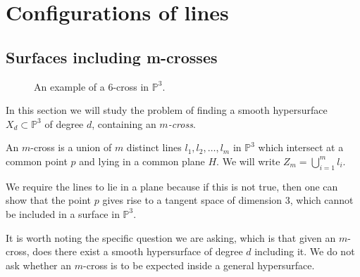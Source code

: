 \chapter{Configurations of lines}\label{configs}
\section{Surfaces including m-crosses}

\begin{figure}
    \centering
    
  \caption{An example of a 6-cross in $\mathbb{P}^3$.}
  \label{fig:Z_6}
\end{figure}

In this section we will study the problem of finding a smooth hypersurface $X_d \subset \mathbb{P}^3$ of degree $d$, containing an \emph{$m$-cross}. 

\begin{definition}
    An $m$-cross is a union of $m$ distinct lines $l_1, l_2, \dots, l_m$ in $\mathbb{P}^3$ which intersect at a common point $p$ and lying in a common plane $H$. We will write $Z_m = \bigcup_{i=1}^m l_i$.
\end{definition}

We require the lines to lie in a plane because if this is not true, then one can show that the point $p$ gives rise to a tangent space of dimension 3, which cannot be included in a surface in $\mathbb{P}^3$. 


It is worth noting the specific question we are asking, which is that given an $m$-cross, does there exist a smooth hypersurface of degree $d$ including it. We do not ask whether an $m$-cross is to be expected inside a general hypersurface.

